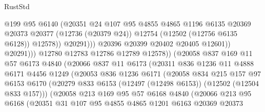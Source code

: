\begin{lexlean}{RustStd}
\begin{coremodule}
                                  @199
                                  @95
                                  @6140
                                  (@20351
                                    @24
                                    @107
                                    @95
                                    @4855
                                    @4865
                                    @1196
                                    @6135
                                    @20369
                                    @20373
                                    @20377
                                    (@12736 (@20379 @24))
                                    @12754
                                    (@12502 (@12756 @6135 @6128))
                                    @12578))
                                @20291)))
                          @20396
                          @20399
                          @20402
                          @20405
                          @12601))
                      @20291)))
                @12780
                @12783
                @12786
                @12789
                @12578))
            (@20058
              @837
              @169
              @11
              @57
              @6173
              @4840
              (@20066
                @837
                @11
                @6173
                (@20311
                  @836
                  @1236
                  @11
                  @4888
                  @6171
                  @4456
                  @1249
                  (@20053
                    @836
                    @1236
                    @6171
                    (@20058
                      @834
                      @215
                      @157
                      @97
                      @6153
                      @6170
                      (@20279 @833 @6153 (@12497 (@12498 @6153)) (@12502 (@12504 @833 @157)))
                      (@20058
                        @213
                        @169
                        @95
                        @57
                        @6168
                        @4840
                        (@20066
                          @213
                          @95
                          @6168
                          (@20351
                            @31
                            @107
                            @95
                            @4855
                            @4865
                            @1201
                            @6163
                            @20369
                            @20373

\end{coremodule}
\end{lexlean}
